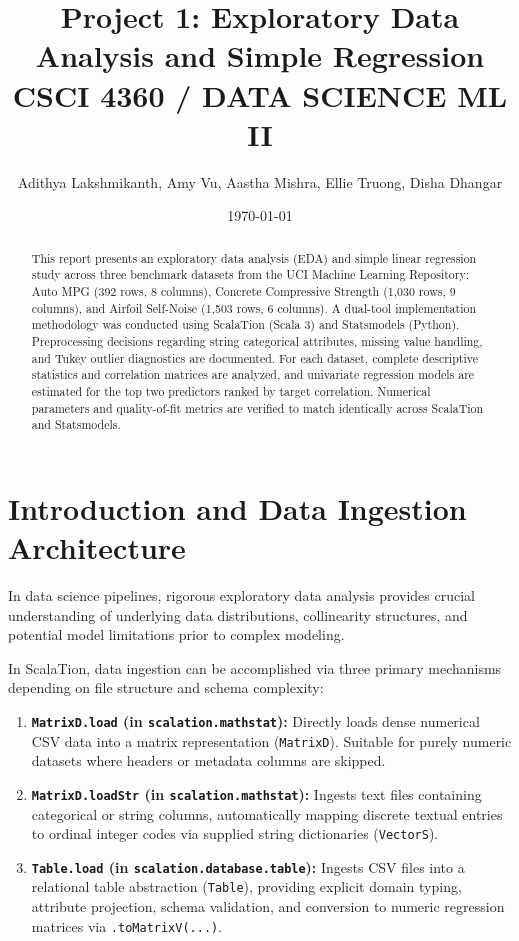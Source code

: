 \documentclass[11pt]{article}
\title{\textbf{Project 1: Exploratory Data Analysis and Simple Regression}\\\large CSCI 4360 / DATA SCIENCE ML II}
\author{Adithya Lakshmikanth, Amy Vu, Aastha Mishra, Ellie Truong, Disha Dhangar}
\date{\today}
\begin{document}
\maketitle

\begin{abstract}
This report presents an exploratory data analysis (EDA) and simple linear regression study across three benchmark datasets from the UCI Machine Learning Repository: Auto MPG (392 rows, 8 columns), Concrete Compressive Strength (1,030 rows, 9 columns), and Airfoil Self-Noise (1,503 rows, 6 columns). A dual-tool implementation methodology was conducted using ScalaTion (Scala 3) and Statsmodels (Python). Preprocessing decisions regarding string categorical attributes, missing value handling, and Tukey outlier diagnostics are documented. For each dataset, complete descriptive statistics and correlation matrices are analyzed, and univariate regression models are estimated for the top two predictors ranked by target correlation. Numerical parameters and quality-of-fit metrics are verified to match identically across ScalaTion and Statsmodels.
\end{abstract}

\section{Introduction and Data Ingestion Architecture}
In data science pipelines, rigorous exploratory data analysis provides crucial understanding of underlying data distributions, collinearity structures, and potential model limitations prior to complex modeling. 

In ScalaTion, data ingestion can be accomplished via three primary mechanisms depending on file structure and schema complexity:
\begin{enumerate}
    \item \textbf{\texttt{MatrixD.load} (in \texttt{scalation.mathstat}):} Directly loads dense numerical CSV data into a matrix representation (\texttt{MatrixD}). Suitable for purely numeric datasets where headers or metadata columns are skipped.
    \item \textbf{\texttt{MatrixD.loadStr} (in \texttt{scalation.mathstat}):} Ingests text files containing categorical or string columns, automatically mapping discrete textual entries to ordinal integer codes via supplied string dictionaries (\texttt{VectorS}).
    \item \textbf{\texttt{Table.load} (in \texttt{scalation.database.table}):} Ingests CSV files into a relational table abstraction (\texttt{Table}), providing explicit domain typing, attribute projection, schema validation, and conversion to numeric regression matrices via \texttt{.toMatrixV(...)}.
\end{enumerate}
\end{document}
